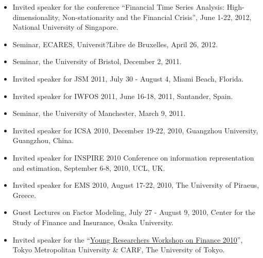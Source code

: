 \documentclass[overlapped,line,letterpaper]{res}
\begin{document}
\begin{resume}
\begin{itemize}
\item[$\bullet$] Invited speaker for the conference ``Financial Time Series Analysis: High-dimensionality, Non-stationarity and the Financial Crisis'', June 1-22, 2012, National University of Singapore. \\

\item[$\bullet$] Seminar, ECARES, Universit?Libre de Bruxelles, April 26, 2012.\\

\item[$\bullet$] Seminar, the University of Bristol, December 2, 2011.\\

\item[$\bullet$] Invited speaker for JSM 2011, July 30 - August 4,
Miami Beach, Florida.

\item[$\bullet$] Invited speaker for IWFOS 2011, June 16-18, 2011, Santander, Spain.\\

\item[$\bullet$] Seminar, the University of Manchester, March 9, 2011.\\

\item[$\bullet$] Invited speaker for ICSA 2010, December 19-22, 2010, Guangzhou University, Guangzhou, China.\\

\item[$\bullet$] Invited speaker for INSPIRE 2010 Conference on information representation and estimation, September 6-8, 2010, UCL, UK.\\

\item[$\bullet$] Invited speaker for EMS 2010, August 17-22, 2010, The University of Piraeus, Greece.\\

\item[$\bullet$] Guest Lectures on Factor Modeling, July 27 - August 9, 2010, Center for the Study of Finance and Insurance, Osaka University.\\

\item[$\bullet$] Invited speaker for the ``\href{http://www.comp.tmu.ac.jp/finance/workshop/Y2010/}{Young Researchers Workshop on Finance
2010}'', Tokyo Metropolitan University \& CARF, The University of
Tokyo.\\


\end{itemize}
\end{resume}
\end{document}

